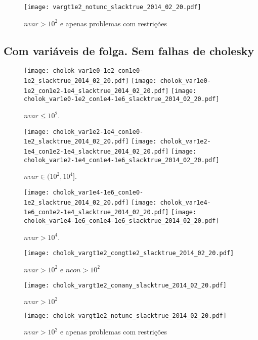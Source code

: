 \documentclass{article}
\begin{document}
\begin{figure}[H]
\centering
\texttt{[image: vargt1e2\_notunc\_slacktrue\_2014\_02\_20.pdf]}
\caption{ $nvar > 10^2$ e apenas problemas com restrições }
\label{fig:nvar_medium_and_big_not_unc}
\end{figure}

\newpage
\subsection{Com variáveis de folga. Sem falhas de cholesky}

\begin{figure}[H]
\centering
\texttt{[image: cholok\_var1e0-1e2\_con1e0-1e2\_slacktrue\_2014\_02\_20.pdf]}
\texttt{[image: cholok\_var1e0-1e2\_con1e2-1e4\_slacktrue\_2014\_02\_20.pdf]}
\texttt{[image: cholok\_var1e0-1e2\_con1e4-1e6\_slacktrue\_2014\_02\_20.pdf]}
\caption{ $nvar \leq 10^2$. }
\label{fig:nvar_small}
\end{figure}
\begin{figure}[H]
\centering
\texttt{[image: cholok\_var1e2-1e4\_con1e0-1e2\_slacktrue\_2014\_02\_20.pdf]}
\texttt{[image: cholok\_var1e2-1e4\_con1e2-1e4\_slacktrue\_2014\_02\_20.pdf]}
\texttt{[image: cholok\_var1e2-1e4\_con1e4-1e6\_slacktrue\_2014\_02\_20.pdf]}
\caption{ $nvar \in (10^2,10^4]$. }
\label{fig:nvar_medium}
\end{figure}
\begin{figure}[H]
\centering
\texttt{[image: cholok\_var1e4-1e6\_con1e0-1e2\_slacktrue\_2014\_02\_20.pdf]}
\texttt{[image: cholok\_var1e4-1e6\_con1e2-1e4\_slacktrue\_2014\_02\_20.pdf]}
\texttt{[image: cholok\_var1e4-1e6\_con1e4-1e6\_slacktrue\_2014\_02\_20.pdf]}
\caption{ $nvar > 10^4$. }
\label{fig:nvar_big}
\end{figure}

\begin{figure}[H]
\centering
\texttt{[image: cholok\_vargt1e2\_congt1e2\_slacktrue\_2014\_02\_20.pdf]}
\caption{ $nvar > 10^2$ e $ncon > 10^2$ }
\label{fig:both_medium_and_big}
\end{figure}

\begin{figure}[H]
\centering
\texttt{[image: cholok\_vargt1e2\_conany\_slacktrue\_2014\_02\_20.pdf]}
\caption{ $nvar > 10^2$ }
\label{fig:nvar_medium_and_big}
\end{figure}

\begin{figure}[H]
\centering
\texttt{[image: cholok\_vargt1e2\_notunc\_slacktrue\_2014\_02\_20.pdf]}
\caption{ $nvar > 10^2$ e apenas problemas com restrições }
\label{fig:nvar_medium_and_big_not_unc}
\end{figure}
\end{document}
